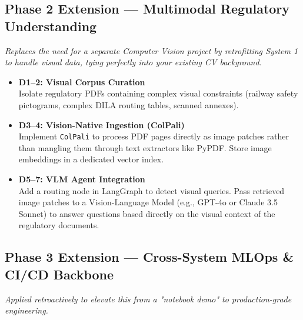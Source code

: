 \documentclass[11pt,a4paper]{article}
\begin{document}
\subsection*{Phase 2 Extension — Multimodal Regulatory Understanding}
\textit{Replaces the need for a separate Computer Vision project by retrofitting System 1 to handle visual data, tying perfectly into your existing CV background.}

\begin{tcolorbox}[systembox={ Step-by-Step: Vision Integration}]
\begin{itemize}[leftmargin=*]
    \item \textbf{D1–2: Visual Corpus Curation}\\
          Isolate regulatory PDFs containing complex visual constraints (railway safety pictograms, complex DILA routing tables, scanned annexes).
    \item \textbf{D3–4: Vision-Native Ingestion (ColPali)}\\
          Implement \texttt{ColPali} to process PDF pages directly as image patches rather than mangling them through text extractors like PyPDF. Store image embeddings in a dedicated vector index.
    \item \textbf{D5–7: VLM Agent Integration}\\
          Add a routing node in LangGraph to detect visual queries. Pass retrieved image patches to a Vision-Language Model (e.g., GPT-4o or Claude 3.5 Sonnet) to answer questions based directly on the visual context of the regulatory documents.
\end{itemize}
\end{tcolorbox}

\subsection*{Phase 3 Extension — Cross-System MLOps \& CI/CD Backbone}
\textit{Applied retroactively to elevate this from a "notebook demo" to production-grade engineering.}
\end{document}
